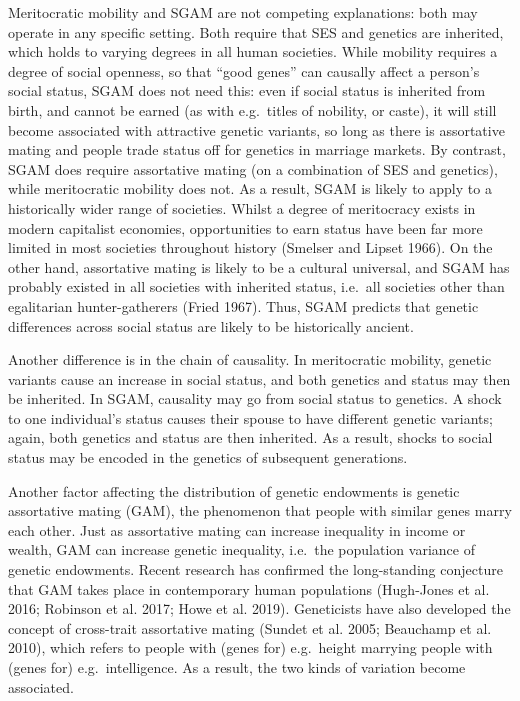 \documentclass[
]{article}
\begin{document}
Meritocratic mobility and SGAM are not competing explanations: both may
operate in any specific setting. Both require that SES and genetics are
inherited, which holds to varying degrees in all human societies. While
mobility requires a degree of social openness, so that ``good genes'' can
causally affect a person's social status, SGAM does not need this: even
if social status is inherited from birth, and cannot be earned (as with
e.g.~titles of nobility, or caste), it will still become associated with
attractive genetic variants, so long as there is assortative mating and
people trade status off for genetics in marriage markets. By contrast,
SGAM does require assortative mating (on a combination of SES and
genetics), while meritocratic mobility does not. As a result, SGAM is
likely to apply to a historically wider range of societies. Whilst a
degree of meritocracy exists in modern capitalist economies,
opportunities to earn status have been far more limited in most
societies throughout history (Smelser and Lipset 1966). On the other hand,
assortative mating is likely to be a cultural universal, and SGAM has
probably existed in all societies with inherited status, i.e.~all
societies other than egalitarian hunter-gatherers (Fried 1967).
Thus, SGAM predicts that genetic differences across social status are
likely to be historically ancient.

Another difference is in the chain of causality. In meritocratic
mobility, genetic variants cause an increase in social status, and both
genetics and status may then be inherited. In SGAM, causality may go
from social status to genetics. A shock to one individual's status
causes their spouse to have different genetic variants; again, both
genetics and status are then inherited. As a result, shocks to social
status may be encoded in the genetics of subsequent generations.

Another factor affecting the distribution of genetic endowments is
genetic assortative mating (GAM), the phenomenon that people with
similar genes marry each other. Just as assortative mating can increase
inequality in income or wealth, GAM can increase genetic inequality,
i.e.~the population variance of genetic endowments. Recent research has
confirmed the long-standing conjecture that GAM takes place in
contemporary human populations (Hugh-Jones et al. 2016; Robinson et al. 2017; Howe et al. 2019). Geneticists have also developed
the concept of cross-trait assortative mating (Sundet et al. 2005; Beauchamp et al. 2010), which refers to people with (genes for) e.g.~height
marrying people with (genes for) e.g.~intelligence. As a result, the two
kinds of variation become associated.
\end{document}
